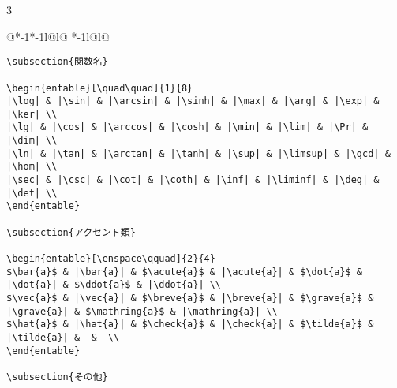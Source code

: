 \documentclass[10pt,a4paper,landscape,dvipdfmx,nomag]{jsarticle}
\makeatletter
\def\set@etsep#1#2{\def\etcolsep{#1}\def\etitemsep{#2}}
\newenvironment{entable}[3][\quad\qquad]{%
  \set@etsep#1\relax\relax
  \begin{tabular}{%
    @{}*{\the\numexpr#3-1}{*{\the\numexpr#2-1}{l@{\etcolsep}}l@{\etitemsep}}%
    *{\the\numexpr#2-1}{l@{\etcolsep}}l@{}}}{%
  \end{tabular}}
\makeatother
\begin{document}
\begin{multicols}{3}
\begin{entable}[\enspace]{2}{1}
\begin{verbatim}
\subsection{関数名}

\begin{entable}[\quad\quad]{1}{8}
|\log| & |\sin| & |\arcsin| & |\sinh| & |\max| & |\arg| & |\exp| & |\ker| \\
|\lg| & |\cos| & |\arccos| & |\cosh| & |\min| & |\lim| & |\Pr| & |\dim| \\
|\ln| & |\tan| & |\arctan| & |\tanh| & |\sup| & |\limsup| & |\gcd| & |\hom| \\
|\sec| & |\csc| & |\cot| & |\coth| & |\inf| & |\liminf| & |\deg| & |\det| \\
\end{entable}

\subsection{アクセント類}

\begin{entable}[\enspace\qquad]{2}{4}
$\bar{a}$ & |\bar{a}| & $\acute{a}$ & |\acute{a}| & $\dot{a}$ & |\dot{a}| & $\ddot{a}$ & |\ddot{a}| \\
$\vec{a}$ & |\vec{a}| & $\breve{a}$ & |\breve{a}| & $\grave{a}$ & |\grave{a}| & $\mathring{a}$ & |\mathring{a}| \\
$\hat{a}$ & |\hat{a}| & $\check{a}$ & |\check{a}| & $\tilde{a}$ & |\tilde{a}| &  &  \\
\end{entable}

\subsection{その他}


\end{verbatim}
\end{entable}
\end{multicols}
\end{document}

